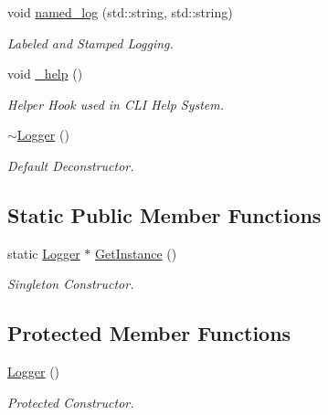 \begin{DoxyCompactItemize}
\mbox{\label{classLogger_aa645cb6ba80081339f01b92d4738f196}} 
void \mbox{\hyperlink{classLogger_aa645cb6ba80081339f01b92d4738f196}{named\+\_\+log}} (std\+::string, std\+::string)
\begin{DoxyCompactList}\small\item\em Labeled and Stamped Logging. \end{DoxyCompactList}\item 
\mbox{\label{classLogger_a4074bf3a723b9d886ef93bd9f55999ec}} 
void \mbox{\hyperlink{classLogger_a4074bf3a723b9d886ef93bd9f55999ec}{\+\_\+help}} ()
\begin{DoxyCompactList}\small\item\em Helper Hook used in C\+LI Help System. \end{DoxyCompactList}\item 
\mbox{\label{classLogger_acb668a9e186a25fbaad2e4af6d1ed00a}} 
\mbox{\hyperlink{classLogger_acb668a9e186a25fbaad2e4af6d1ed00a}{$\sim$\+Logger}} ()
\begin{DoxyCompactList}\small\item\em Default Deconstructor. \end{DoxyCompactList}\end{DoxyCompactItemize}
\subsection*{Static Public Member Functions}
\begin{DoxyCompactItemize}
\item 
static \mbox{\hyperlink{classLogger}{Logger}} $\ast$ \mbox{\hyperlink{classLogger_a58ba0fb326628410e7d67fe18d2e1fbf}{Get\+Instance}} ()
\begin{DoxyCompactList}\small\item\em Singleton Constructor. \end{DoxyCompactList}\end{DoxyCompactItemize}
\subsection*{Protected Member Functions}
\begin{DoxyCompactItemize}
\item 
\mbox{\label{classLogger_abc41bfb031d896170c7675fa96a6b30c}} 
\mbox{\hyperlink{classLogger_abc41bfb031d896170c7675fa96a6b30c}{Logger}} ()
\begin{DoxyCompactList}\small\item\em Protected Constructor. \end{DoxyCompactList}\end{DoxyCompactItemize}


